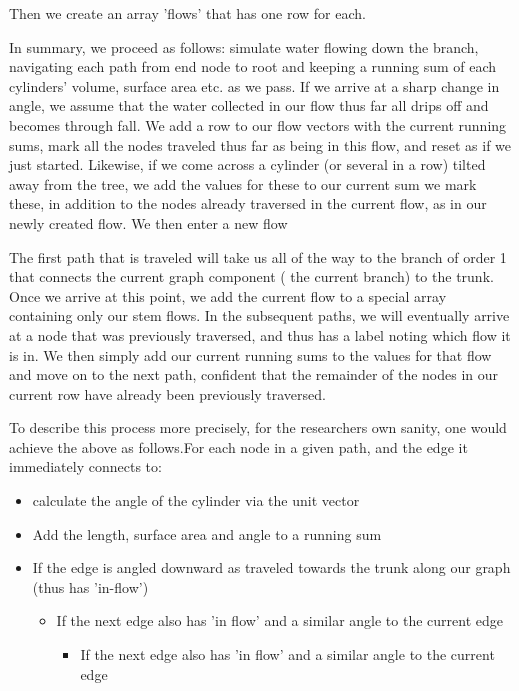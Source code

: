 \documentclass[jou,apacite]{apa6}
\begin{document}
Then we create an array 'flows' that has one row for each.

In summary, we proceed as follows: simulate water flowing down the branch, navigating each path from end node to root and keeping a running sum of each cylinders' volume, surface area etc. as we pass.  If we arrive at a sharp change in angle, we assume that the water collected in our flow thus far all drips off and becomes through fall. We add a row to our flow vectors with the current running sums, mark all the nodes traveled thus far as being in this flow, and reset as if we just started. Likewise, if we come across a cylinder (or several in a row) tilted away from the tree, we add the values for these to our current sum we mark these, in addition to the nodes already traversed in the current flow, as in our newly created flow. We then enter a new flow 

The first path that is traveled will take us all of the way to the branch of order 1 that connects the current graph component ( the current branch) to the trunk. Once we arrive at this point, we add the current flow to a special array containing only our stem flows. In the subsequent paths, we will eventually arrive at a node that was previously traversed, and thus has a label noting which flow it is in. We then simply add our current running sums to the values for that flow and move on to the next path, confident that the remainder of the nodes in our current row have already been previously traversed.

To describe this process more precisely, for the researchers own sanity, one would achieve the above as follows.For each node in a given path, and the edge it immediately connects to:
\begin{itemize}
    \item calculate the angle of the cylinder via the unit vector
    \item Add the length, surface area and angle to a running sum
    \item If the edge is angled downward as traveled towards the trunk along our graph (thus has 'in-flow')
    \begin{itemize}
        \item If the next edge also has 'in flow' and a similar angle to the current edge
        \begin{itemize}
            \item If the next edge also has 'in flow' and a similar angle to the current edge
    
        \end{itemize}
    \end{itemize}
\end{itemize}
    
\end{document}
